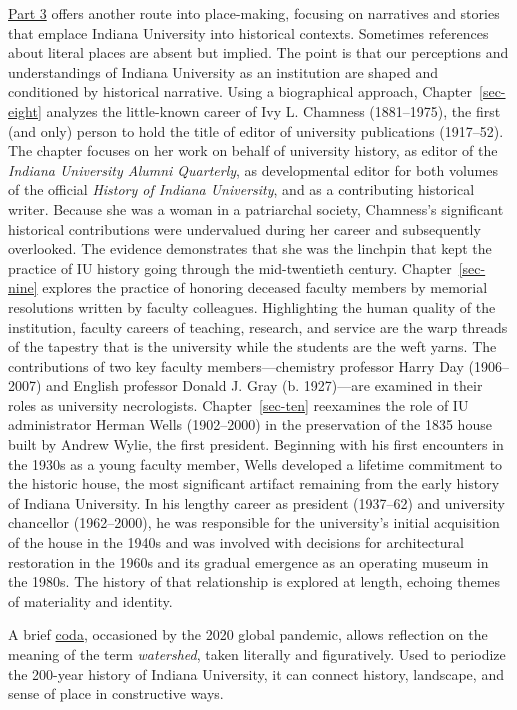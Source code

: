 \documentclass[
  american,
  letterpaper,
]{scrreprt}
\begin{document}
\hyperref[sec-partthree]{Part 3} offers another route into place-making,
focusing on narratives and stories that emplace Indiana University into
historical contexts. Sometimes references about literal places are
absent but implied. The point is that our perceptions and understandings
of Indiana University as an institution are shaped and conditioned by
historical narrative. Using a biographical approach,
Chapter~\ref{sec-eight} analyzes the little-known career of Ivy L.
Chamness (1881--1975), the first (and only) person to hold the title of
editor of university publications (1917--52). The chapter focuses on her
work on behalf of university history, as editor of the \emph{Indiana
University Alumni Quarterly}, as developmental editor for both volumes
of the official \emph{History of Indiana University}, and as a
contributing historical writer. Because she was a woman in a patriarchal
society, Chamness's significant historical contributions were
undervalued during her career and subsequently overlooked. The evidence
demonstrates that she was the linchpin that kept the practice of IU
history going through the mid-twentieth century. Chapter~\ref{sec-nine}
explores the practice of honoring deceased faculty members by memorial
resolutions written by faculty colleagues. Highlighting the human
quality of the institution, faculty careers of teaching, research, and
service are the warp threads of the tapestry that is the university
while the students are the weft yarns. The contributions of two key
faculty members---chemistry professor Harry Day (1906--2007) and English
professor Donald J. Gray (b. 1927)---are examined in their roles as
university necrologists. Chapter~\ref{sec-ten} reexamines the role of IU
administrator Herman Wells (1902--2000) in the preservation of the 1835
house built by Andrew Wylie, the first president. Beginning with his
first encounters in the 1930s as a young faculty member, Wells developed
a lifetime commitment to the historic house, the most significant
artifact remaining from the early history of Indiana University. In his
lengthy career as president (1937--62) and university chancellor
(1962--2000), he was responsible for the university's initial
acquisition of the house in the 1940s and was involved with decisions
for architectural restoration in the 1960s and its gradual emergence as
an operating museum in the 1980s. The history of that relationship is
explored at length, echoing themes of materiality and identity.

A brief \hyperref[sec-coda]{coda}, occasioned by the 2020 global
pandemic, allows reflection on the meaning of the term \emph{watershed},
taken literally and figuratively. Used to periodize the 200-year history
of Indiana University, it can connect history, landscape, and sense of
place in constructive ways.
\end{document}
